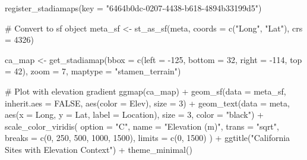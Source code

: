 \documentclass[
  11pt,
]{article}
\newenvironment{Shaded}{\begin{snugshade}}{\end{snugshade}}
\newcommand{\AttributeTok}[1]{\textcolor[rgb]{0.40,0.45,0.13}{#1}}
\newcommand{\CommentTok}[1]{\textcolor[rgb]{0.37,0.37,0.37}{#1}}
\newcommand{\ConstantTok}[1]{\textcolor[rgb]{0.56,0.35,0.01}{#1}}
\newcommand{\DecValTok}[1]{\textcolor[rgb]{0.68,0.00,0.00}{#1}}
\newcommand{\FunctionTok}[1]{\textcolor[rgb]{0.28,0.35,0.67}{#1}}
\newcommand{\NormalTok}[1]{\textcolor[rgb]{0.00,0.23,0.31}{#1}}
\newcommand{\OtherTok}[1]{\textcolor[rgb]{0.00,0.23,0.31}{#1}}
\newcommand{\SpecialCharTok}[1]{\textcolor[rgb]{0.37,0.37,0.37}{#1}}
\newcommand{\StringTok}[1]{\textcolor[rgb]{0.13,0.47,0.30}{#1}}
\begin{document}
\begin{Shaded}
\begin{Highlighting}[]
\FunctionTok{register\_stadiamaps}\NormalTok{(}\AttributeTok{key =} \StringTok{"6464b0dc{-}0207{-}4438{-}b618{-}4894b33199d5"}\NormalTok{)}

\CommentTok{\# Convert to sf object}
\NormalTok{meta\_sf }\OtherTok{\textless{}{-}} \FunctionTok{st\_as\_sf}\NormalTok{(meta, }\AttributeTok{coords =} \FunctionTok{c}\NormalTok{(}\StringTok{"Long"}\NormalTok{, }\StringTok{"Lat"}\NormalTok{), }\AttributeTok{crs =} \DecValTok{4326}\NormalTok{)}

\NormalTok{ca\_map }\OtherTok{\textless{}{-}} \FunctionTok{get\_stadiamap}\NormalTok{(}\AttributeTok{bbox =} \FunctionTok{c}\NormalTok{(}\AttributeTok{left =} \SpecialCharTok{{-}}\DecValTok{125}\NormalTok{, }\AttributeTok{bottom =} \DecValTok{32}\NormalTok{, }\AttributeTok{right =} \SpecialCharTok{{-}}\DecValTok{114}\NormalTok{, }\AttributeTok{top =} \DecValTok{42}\NormalTok{),}
                        \AttributeTok{zoom =} \DecValTok{7}\NormalTok{, }\AttributeTok{maptype =} \StringTok{"stamen\_terrain"}\NormalTok{)}


\CommentTok{\# Plot with elevation gradient}
\FunctionTok{ggmap}\NormalTok{(ca\_map) }\SpecialCharTok{+}
  \FunctionTok{geom\_sf}\NormalTok{(}\AttributeTok{data =}\NormalTok{ meta\_sf, }\AttributeTok{inherit.aes =} \ConstantTok{FALSE}\NormalTok{, }\FunctionTok{aes}\NormalTok{(}\AttributeTok{color =}\NormalTok{ Elev), }\AttributeTok{size =} \DecValTok{3}\NormalTok{) }\SpecialCharTok{+}
  \FunctionTok{geom\_text}\NormalTok{(}\AttributeTok{data =}\NormalTok{ meta, }\FunctionTok{aes}\NormalTok{(}\AttributeTok{x =}\NormalTok{ Long, }\AttributeTok{y =}\NormalTok{ Lat, }\AttributeTok{label =}\NormalTok{ Location), }\AttributeTok{size =} \DecValTok{3}\NormalTok{, }\AttributeTok{color =} \StringTok{"black"}\NormalTok{) }\SpecialCharTok{+}
  \FunctionTok{scale\_color\_viridis}\NormalTok{(}
    \AttributeTok{option =} \StringTok{"C"}\NormalTok{,}
    \AttributeTok{name =} \StringTok{"Elevation (m)"}\NormalTok{,}
    \AttributeTok{trans =} \StringTok{"sqrt"}\NormalTok{,}
    \AttributeTok{breaks =} \FunctionTok{c}\NormalTok{(}\DecValTok{0}\NormalTok{, }\DecValTok{250}\NormalTok{, }\DecValTok{500}\NormalTok{, }\DecValTok{1000}\NormalTok{, }\DecValTok{1500}\NormalTok{),}
    \AttributeTok{limits =} \FunctionTok{c}\NormalTok{(}\DecValTok{0}\NormalTok{, }\DecValTok{1500}\NormalTok{)}
\NormalTok{  ) }\SpecialCharTok{+}
  \FunctionTok{ggtitle}\NormalTok{(}\StringTok{"California Sites with Elevation Context"}\NormalTok{) }\SpecialCharTok{+}
  \FunctionTok{theme\_minimal}\NormalTok{()}
\end{Highlighting}
\end{Shaded}
\end{document}
